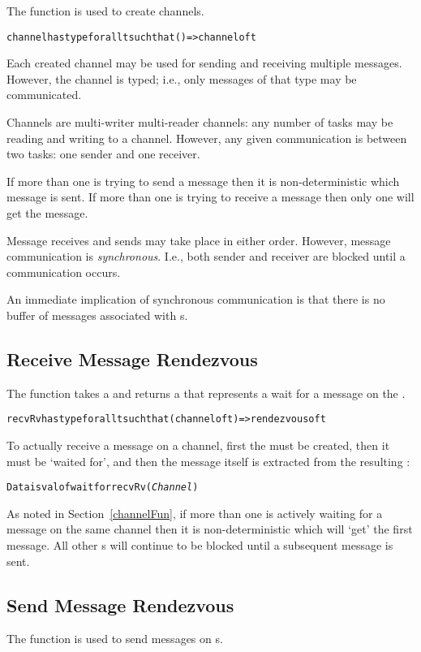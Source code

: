 The  function is used to create channels. 
\begin{alltt}
channel has type for all t such that ()=>channel of t
\end{alltt}
Each created channel may be used for sending and receiving multiple messages. However, the channel is typed; i.e., only messages of that type may be communicated.

Channels are multi-writer multi-reader channels: any number of tasks may be reading and writing to a channel. However, any given communication is between two tasks: one sender and one receiver.

If more than one  is trying to send a message then it is non-deterministic which message is sent. If more than one  is trying to receive a message then only one will get the message.

Message receives and sends may take place in either order. However, message communication is \emph{synchronous}. I.e., both sender and receiver are blocked until a communication occurs. 

An immediate implication of synchronous communication is that there is no buffer of messages associated with s.

\subsection{Receive Message Rendezvous}
\label{recvRvFun}
The  function takes a  and returns a  that represents a wait for a message on the .

\begin{alltt}
recvRv has type for all t such that (channel of t)=>rendezvous of t
\end{alltt}

To actually receive a message on a channel, first the  must be created, then it must be `waited for', and then the message itself is extracted from the resulting :
\begin{alltt}
Data is valof wait for recvRv(\emph{Channel})
\end{alltt}

As noted in Section~\vref{channelFun}, if more than one  is actively waiting for a message on the same channel then it is non-deterministic which  will `get' the first message. All other s will continue to be blocked until a subsequent message is sent.

\subsection{Send Message Rendezvous}
\label{sendRvFun}
The  function is used to send messages on s. 

